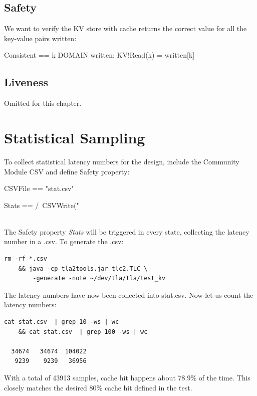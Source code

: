 \subsection{Safety}

We want to verify the KV store with cache returns the correct value for 
all the key-value pairs written:\\

\begin{tla}
Consistent == 
    \A k \in DOMAIN written: 
        KV!Read(k) = written[k]
\end{tla}
\begin{tlatex}
%
%
%
\end{tlatex}

\subsection{Liveness}

Omitted for this chapter.

\section{Statistical Sampling}

To collect statistical latency numbers for the design, include the Community
Module CSV and define Safety property:\\

\begin{tla}
CSVFile ==
    "stat.csv"

Stats ==
    /\ CSVWrite("%
\end{tla}
\begin{tlatex}
%
%
\@pvspace{8.0pt}%
%
\end{tlatex}
\\

The Safety property \textit{Stats} will be triggered in every state, collecting
the latency number in a .csv. To generate the .csv: 

\begin{verbatim}
rm -rf *.csv 
    && java -cp tla2tools.jar tlc2.TLC \
        -generate -note ~/dev/tla/tla/test_kv
\end{verbatim}

The latency numbers have now been collected into stat.csv. Now let us count the
latency numbers:

\begin{verbatim}
cat stat.csv  | grep 10 -ws | wc 
    && cat stat.csv  | grep 100 -ws | wc

  34674   34674  104022
   9239    9239   36956
\end{verbatim}

With a total of 43913 samples, cache hit happens about 78.9\% of the time. This 
closely matches the desired 80\% cache hit defined in the test.

% 
